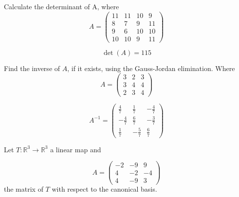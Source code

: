 \begin{questions}

\question Calculate the determinant of A, where
$$
A=\left(\begin{array}{rrrr}
11 & 11 & 10 & 9 \\
8 & 7 & 9 & 11 \\
9 & 6 & 10 & 10 \\
10 & 10 & 9 & 11
\end{array}\right)
$$

\begin{solution}
$$\det(A)=115$$
\end{solution}

\question Find the inverse of $A$, if it exists, using the Gauss-Jordan elimination. Where
$$
A=\left(\begin{array}{rrr}
3 & 2 & 3 \\
3 & 4 & 4 \\
2 & 3 & 4
\end{array}\right)
$$

\begin{solution}
$$A^{-1}=\left(\begin{array}{rrr}
\frac{4}{7} & \frac{1}{7} & -\frac{4}{7} \\
-\frac{4}{7} & \frac{6}{7} & -\frac{3}{7} \\
\frac{1}{7} & -\frac{5}{7} & \frac{6}{7}
\end{array}\right)$$
\end{solution}

\question Let $T:\mathbb{R}^3\rightarrow\mathbb{R}^3$  a linear map and
 
$$
A=\left(\begin{array}{rrr}
-2 & -9 & 9 \\
4 & -2 & -4 \\
4 & -9 & 3
\end{array}\right)
$$
the matrix of $T$ with respect to the canonical basis.
\end{questions}
